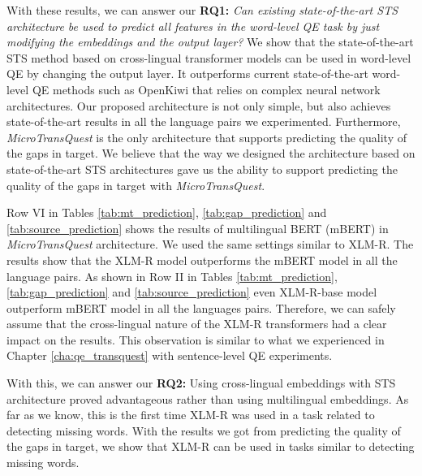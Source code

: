 With these results, we can answer our \textbf{RQ1:} \textit{Can existing state-of-the-art STS architecture be used to predict all features in the word-level QE task by just modifying the embeddings and the output layer?} We show that the state-of-the-art STS method based on cross-lingual transformer models can be used in word-level QE  by changing the output layer. It outperforms current state-of-the-art word-level QE methods such as OpenKiwi that relies on complex neural network architectures. Our proposed architecture is not only simple, but also achieves state-of-the-art results in all the language pairs we experimented. Furthermore, \textit{MicroTransQuest} is the only architecture that supports predicting the quality of the gaps in target. We believe that the way we designed the architecture based on state-of-the-art STS architectures gave us the ability to support predicting the quality of the gaps in target with \textit{MicroTransQuest}.

Row VI in Tables \ref{tab:mt_prediction}, \ref{tab:gap_prediction} and \ref{tab:source_prediction} shows the results of multilingual BERT (mBERT) in \textit{MicroTransQuest} architecture. We used the same settings similar to XLM-R. The results show that the XLM-R model outperforms the mBERT model in all the language pairs. As shown in Row II in Tables \ref{tab:mt_prediction}, \ref{tab:gap_prediction} and \ref{tab:source_prediction} even XLM-R-base model outperform mBERT model in all the languages pairs. Therefore, we can safely assume that the cross-lingual nature of the XLM-R transformers had a clear impact on the results. This observation is similar to what we experienced in Chapter \ref{cha:qe_transquest} with sentence-level QE experiments.

With this, we can answer our \textbf{RQ2:} Using cross-lingual embeddings with STS architecture proved advantageous rather than using multilingual embeddings. As far as we know, this is the first time XLM-R was used in a task related to detecting missing words. With the results we got from predicting the quality of the gaps in target, we show that XLM-R can be used in tasks similar to detecting missing words.
 

